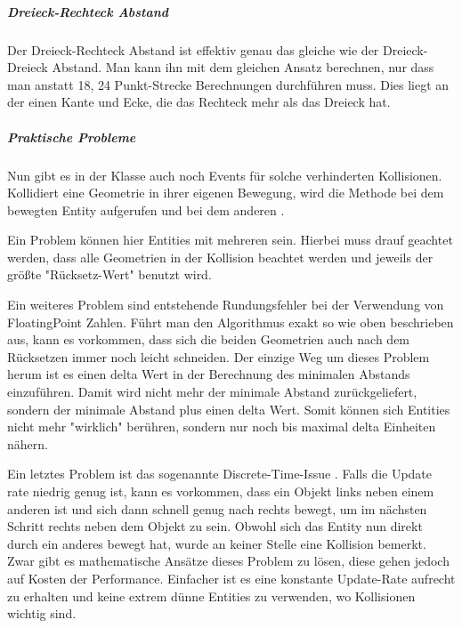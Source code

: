 \subparagraph{Dreieck-Rechteck Abstand}

Der Dreieck-Rechteck Abstand ist effektiv genau das gleiche wie der Dreieck-Dreieck Abstand. Man kann ihn mit dem gleichen Ansatz berechnen, nur dass man anstatt 18, 24 Punkt-Strecke Berechnungen durchführen muss. Dies liegt an der einen Kante und Ecke, die das Rechteck mehr als das Dreieck hat.

\subparagraph{Praktische Probleme}

Nun gibt es in der Klasse  auch noch Events für solche verhinderten Kollisionen. Kollidiert eine Geometrie in ihrer eigenen Bewegung, wird die Methode  bei dem bewegten Entity aufgerufen und bei dem anderen .

Ein Problem können hier Entities mit mehreren  sein. Hierbei muss drauf geachtet werden, dass alle Geometrien in der Kollision beachtet werden und jeweils der größte "Rücksetz-Wert" benutzt wird.

Ein weiteres Problem sind entstehende Rundungsfehler bei der Verwendung von FloatingPoint Zahlen. Führt man den Algorithmus exakt so wie oben beschrieben aus, kann es vorkommen, dass sich die beiden Geometrien auch nach dem Rücksetzen immer noch leicht schneiden. Der einzige Weg um dieses Problem herum ist es einen delta Wert in der Berechnung des minimalen Abstands einzuführen.\cite[S 18]{KRAY} Damit wird nicht mehr der minimale Abstand zurückgeliefert, sondern der minimale Abstand plus einen delta Wert. Somit können sich Entities nicht mehr "wirklich" berühren, sondern nur noch bis maximal delta Einheiten nähern.

Ein letztes Problem ist das sogenannte Discrete-Time-Issue \cite[S 503]{DGIJ}  \cite[S 14]{ACP}. Falls die Update rate niedrig genug ist, kann es vorkommen, dass ein Objekt links neben einem anderen ist und sich dann schnell genug nach rechts bewegt, um im nächsten Schritt rechts neben dem Objekt zu sein. Obwohl sich das Entity nun direkt durch ein anderes bewegt hat, wurde an keiner Stelle eine Kollision bemerkt. Zwar gibt es mathematische Ansätze dieses Problem zu lösen, diese gehen jedoch auf Kosten der Performance.\cite[S 11ff]{KRAY} Einfacher ist es eine konstante Update-Rate aufrecht zu erhalten und keine extrem dünne Entities zu verwenden, wo Kollisionen wichtig sind.


